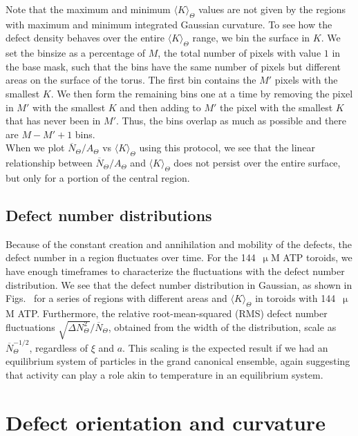 Note that the maximum and minimum $\langle K \rangle_{\Theta}$ values are not given by the regions with maximum and minimum integrated Gaussian curvature.
To see how the defect density behaves over the entire $\langle K \rangle_{\Theta}$ range, we bin the surface in $K$.
We set the binsize as a percentage of $M$, the total number of pixels with value $1$ in the base mask, such that the bins have the same number of pixels but different areas on the surface of the torus.
The first bin contains the $M'$ pixels with the smallest $K$.
We then form the remaining bins one at a time by removing the pixel in $M'$ with the smallest $K$ and then adding to $M'$ the pixel with the smallest $K$ that has never been in $M'$.
Thus, the bins overlap as much as possible and there are $M-M'+1$ bins. \\

When we plot $\overbar{N}_{\Theta}/A_{\Theta}$ vs $\langle K \rangle_{\Theta}$ using this protocol, we see that the linear relationship between $\overbar{N}_{\Theta}/A_{\Theta}$ and $\langle K \rangle_{\Theta}$ does not persist over the entire surface, but only for a portion of the central region. 


\subsection{Defect number distributions}
Because of the constant creation and annihilation and mobility of the defects, the defect number in a region fluctuates over time.
For the 144~$\upmu$M ATP toroids, we have enough timeframes to characterize the fluctuations with the defect number distribution.
We see that the defect number distribution in Gaussian, as shown in Figs.~ for a series of regions with different areas and $\langle K \rangle_{\Theta}$ in toroids with 144~$\upmu$M ATP.
Furthermore, the relative root-mean-squared (RMS) defect number fluctuations $\displaystyle{\sqrt{\Delta N_{\Theta}^2}} \bigg / \displaystyle {\overbar{N}_{\Theta}}$, obtained from the width of the distribution, scale as $\displaystyle{\overbar{N}_{\Theta}^{-1/2}}$, regardless of $\xi$ and $a$.
This scaling is the expected result if we had an equilibrium system of particles in the grand canonical ensemble, again suggesting that activity can play a role akin to temperature in an equilibrium system.




\section{Defect orientation and curvature}

